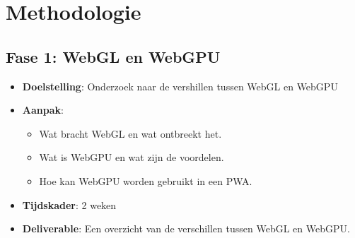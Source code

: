 \section{Methodologie}%
\label{sec:methodologie}







\subsection*{Fase 1: WebGL en WebGPU}

\begin{itemize}
\item \textbf{Doelstelling}: Onderzoek naar de vershillen tussen WebGL en WebGPU
\item \textbf{Aanpak}:
\begin{itemize}
\item Wat bracht WebGL en wat ontbreekt het.
\item Wat is WebGPU en wat zijn de voordelen.
\item Hoe kan WebGPU worden gebruikt in een PWA.
\end{itemize}
\item \textbf{Tijdskader}: 2 weken
\item \textbf{Deliverable}: Een overzicht van de verschillen tussen WebGL en WebGPU.
\end{itemize}

